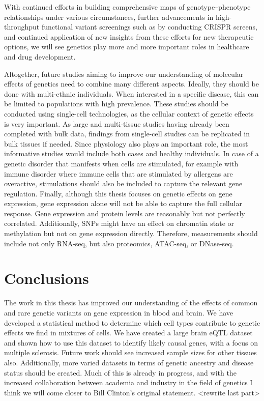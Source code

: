 With continued efforts in building comprehensive maps of genotype‒phenotype relationships under various circumstances, further advancements in high-throughput functional variant screenings such as by conducting CRISPR screens, and continued application of new insights from these efforts for new therapeutic options, we will see genetics play more and more important roles in healthcare and drug development.

Altogether, future studies aiming to improve our understanding of molecular effects of genetics need to combine many different aspects. Ideally, they should be done with multi-ethnic individuals. When interested in a specific disease, this can be limited to populations with high prevalence. These studies should be conducted using single-cell technologies, as the cellular context of genetic effects is very important. As large\cite{vosaUnravelingPolygenicArchitecture2018} and multi-tissue\cite{GTExConsortiumAtlas} studies having already been completed with bulk data, findings from single-cell studies can be replicated in bulk tissues if needed. Since physiology also plays an important role, the most informative studies would include both cases and healthy individuals. In case of a genetic disorder that manifests when cells are stimulated, for example with immune disorder where immune cells that are stimulated by allergens are overactive, stimulations should also be included to capture the relevant gene regulation. Finally, although this thesis focuses on genetic effects on gene expression, gene expression alone will not be able to capture the full cellular response. Gene expression and protein levels are reasonably but not perfectly correlated\cite{buccitelliMRNAsProteinsEmerging2020}. Additionally, SNPs might have an effect on chromatin state or methylation but not on gene expression directly. Therefore, measurements should include not only RNA-seq, but also proteomics, ATAC-seq, or DNase-seq. 

\section{Conclusions}
The work in this thesis has improved our understanding of the effects of common and rare genetic variants on gene expression in blood and brain. We have developed a statistical method to determine which cell types contribute to genetic effects we find in mixtures of cells. We have created a large brain eQTL dataset and shown how to use this dataset to identify likely causal genes, with a focus on multiple sclerosis. Future work should see increased sample sizes for other tissues also. Additionally, more varied datasets in terms of genetic ancestry and disease status should be created. Much of this is already in progress, and with the increased collaboration between academia and industry in the field of genetics I think we will come closer to Bill Clinton's original statement. <rewrite last part> 





